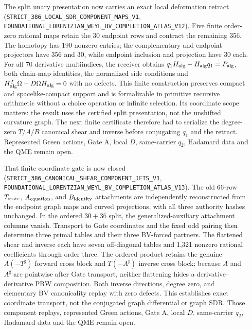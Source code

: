 \documentclass[11pt]{article}
\theoremstyle{definition}
\theoremstyle{remark}
\newcommand{\cert}[1]{\nolinkurl{#1}}
\begin{document}
The split unary presentation now carries an exact local deformation retract
(\cert{STRICT_386_LOCAL_SDR_COMPONENT_MAPS_V1},
\cert{FOUNDATIONAL_LORENTZIAN_WEYL_BV_COMPLETION_ATLAS_V12}).  Five finite
order-zero rational maps retain the 30 endpoint rows and contract the remaining
356.  The homotopy has 190 nonzero entries; the complementary and endpoint
projectors have 356 and 30, while endpoint inclusion and projection have 30
each.  For all 70 derivative multiindices, the receiver obtains
\(q_1H_{\rm alg}+H_{\rm alg}q_1=P_{\rm alg}\), both chain-map identities,
the normalized side conditions and
\(H_{\rm alg}^{T}\Omega-D\Omega H_{\rm alg}=0\) with no defects.  This finite
construction preserves compact and spacelike-compact support and is
formalizable in primitive recursive arithmetic without a choice operation or
infinite selection.  Its coordinate scope matters: the result uses the
certified split presentation, not the unshifted curvature graph.  The next
finite certificate therefore had to serialize the degree-zero \(T/A/B\)
canonical shear and inverse before conjugating \(q_1\) and the retract.
Represented Green actions, Gate A, local \(D\),
same-carrier \(q_2\), Hadamard data and the QME remain open.

That finite coordinate gate is now closed
(\cert{STRICT_386_CANONICAL_SHEAR_COMPONENT_JETS_V1},
\cert{FOUNDATIONAL_LORENTZIAN_WEYL_BV_COMPLETION_ATLAS_V13}).  The old
66-row \(T_{\rm state}\), \(A_{\rm equation}\), and \(B_{\rm identity}\)
attachments are independently reconstructed from the endpoint graph maps and
curved projections, with all three authority hashes unchanged.  In the
ordered \(30+36\) split, the generalized-auxiliary attachment columns vanish.
Transport to Gate coordinates and the fixed odd pairing then determine three
primal tables and their three BV-forced partners.  The flattened shear and
inverse each have seven off-diagonal tables and 1,321 nonzero rational
coefficients through order three.  The ordered product retains the genuine
\(A(-T^\sharp)\) forward cross block and \(T(-A^\sharp)\) inverse cross block;
because \(A\) and \(A^\sharp\) are pointwise after Gate transport, neither
flattening hides a derivative--derivative PBW composition.  Both inverse
directions, degree zero, and elementary BV canonicality replay with zero
defects.  This establishes exact coordinate transport, not the conjugated
graph differential or graph SDR.  Those component replays, represented Green
actions, Gate A, local \(D\), same-carrier \(q_2\), Hadamard data and the QME
remain open.
\end{document}
